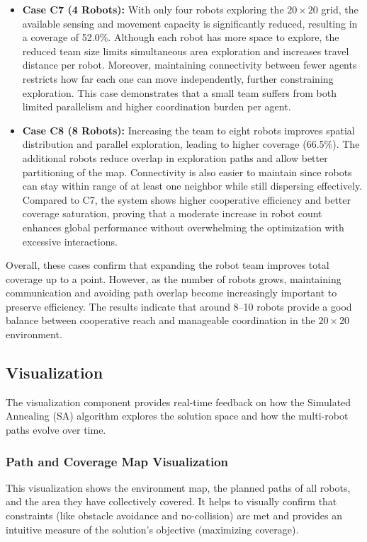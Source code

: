 \begin{itemize}
    \item \textbf{Case C7 (4 Robots):}  
    With only four robots exploring the $20 \times 20$ grid, the available sensing and movement capacity is significantly reduced, resulting in a coverage of 52.0\%. 
    Although each robot has more space to explore, the reduced team size limits simultaneous area exploration and increases travel distance per robot. 
    Moreover, maintaining connectivity between fewer agents restricts how far each one can move independently, further constraining exploration. 
    This case demonstrates that a small team suffers from both limited parallelism and higher coordination burden per agent.

    \item \textbf{Case C8 (8 Robots):}  
    Increasing the team to eight robots improves spatial distribution and parallel exploration, leading to higher coverage (66.5\%). 
    The additional robots reduce overlap in exploration paths and allow better partitioning of the map. 
    Connectivity is also easier to maintain since robots can stay within range of at least one neighbor while still dispersing effectively. 
    Compared to C7, the system shows higher cooperative efficiency and better coverage saturation, proving that a moderate increase in robot count enhances global performance without overwhelming the optimization with excessive interactions.
\end{itemize}

Overall, these cases confirm that expanding the robot team improves total coverage up to a point. 
However, as the number of robots grows, maintaining communication and avoiding path overlap become increasingly important to preserve efficiency. 
The results indicate that around 8–10 robots provide a good balance between cooperative reach and manageable coordination in the $20 \times 20$ environment.



\subsection{Visualization}

The visualization component provides real-time feedback on how the Simulated Annealing (SA) algorithm explores the solution space and how the multi-robot paths evolve over time.

\subsubsection{Path and Coverage Map Visualization}
This visualization shows the environment map, the planned paths of all robots, and the area they have collectively covered. It helps to visually confirm that constraints (like obstacle avoidance and no-collision) are met and provides an intuitive measure of the solution's objective (maximizing coverage).

